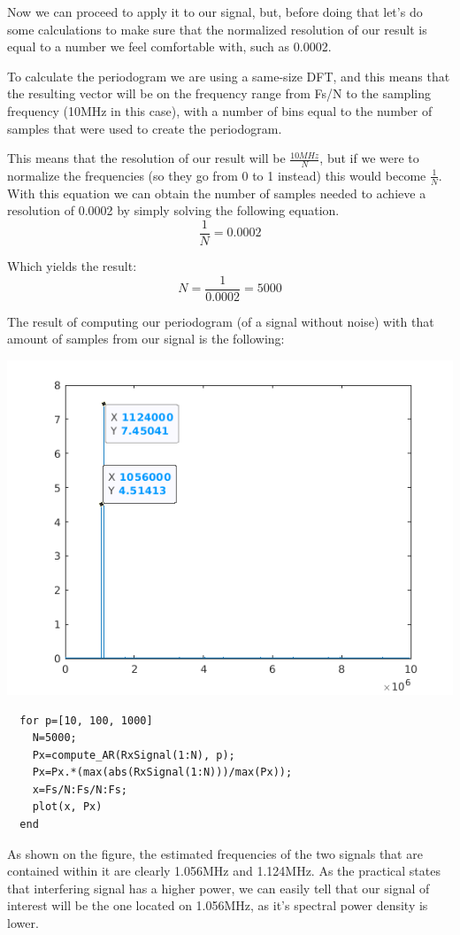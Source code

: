 \documentclass[conference,9pt]{IEEEtran}
\begin{document}
Now we can proceed to apply it to our signal, but, before doing that let's do some calculations to make sure that the normalized resolution of our result is equal to a number we feel comfortable with, such as 0.0002.

To calculate the periodogram we are using a same-size DFT, and this means that the resulting vector will be on the frequency range from Fs/N to the sampling frequency (10MHz in this case), with a number of bins equal to the number of samples that were used to create the periodogram.

This means that the resolution of our result will be $\frac{10MHz}{N}$, but if we were to normalize the frequencies (so they go from 0 to 1 instead) this would become $\frac{1}{N}$. With this equation we can obtain the number of samples needed to achieve a resolution of 0.0002 by simply solving the following equation.
$$\frac{1}{N}=0.0002$$

Which yields the result:
$$N=\frac{1}{0.0002}=5000$$

The result of computing our periodogram (of a signal without noise) with that amount of samples from our signal is the following:

\includegraphics[scale=0.6]{q4}
\begin{verbatim}
  for p=[10, 100, 1000]
    N=5000;
    Px=compute_AR(RxSignal(1:N), p);
    Px=Px.*(max(abs(RxSignal(1:N)))/max(Px));
    x=Fs/N:Fs/N:Fs;
    plot(x, Px)
  end
\end{verbatim}
As shown on the figure, the estimated frequencies of the two signals that are contained within it are clearly 1.056MHz and 1.124MHz. As the practical states that interfering signal has a higher power, we can easily tell that our signal of interest will be the one located on 1.056MHz, as it's spectral power density is lower.
\end{document}
